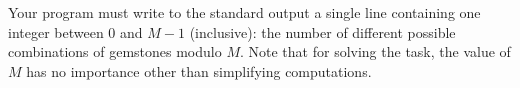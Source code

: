 Your program must write to the standard output a single line containing one integer between $0$ and $M - 1$ (inclusive):  the number of different possible combinations of gemstones modulo $M$.   Note that for solving the task, the value of $M$ has no importance other than simplifying computations.